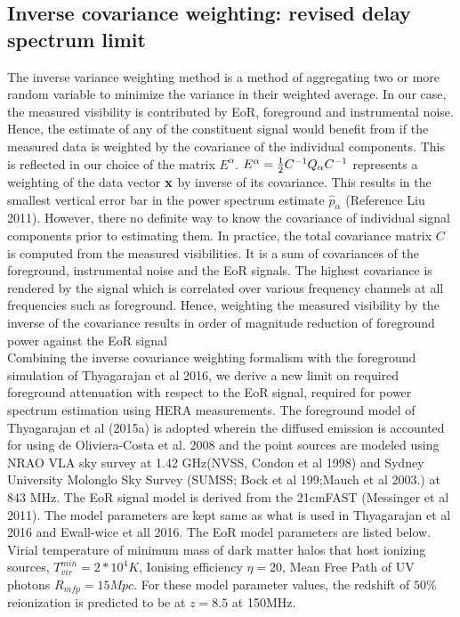 \documentclass[twocolumn]{emulateapj}
\begin{document}
\subsection{Inverse covariance weighting: revised delay spectrum limit}
The inverse variance weighting method is a method of aggregating two or more random variable to minimize the variance in their weighted average. In our case, the measured visibility is contributed by EoR, foreground and instrumental noise. Hence, the estimate of any of the constituent signal would benefit from if the measured data is weighted by the covariance of the individual components. This is reflected in our choice of the matrix $E^{\alpha}$.  $E^{\alpha} = {1 \over 2} C^{-1} Q_{\alpha} C^{-1}$ represents a weighting of the data vector $\bold x$ by inverse of its covariance. This results in the smallest vertical error bar in the power spectrum estimate $\hat p_{\alpha}$ (Reference Liu 2011). 
However, there no definite way to know the covariance of individual signal components prior to estimating them. In practice, the total covariance matrix $C$ is computed from the measured visibilities. It is a sum of covariances of the foreground, instrumental noise and the EoR signals. The highest covariance is rendered by the signal which is correlated over various frequency channels at all frequencies such as foreground. Hence, weighting the measured visibility by the inverse of the covariance results in order of magnitude reduction of foreground power against the EoR signal \\
 Combining the inverse covariance weighting formalism with the foreground simulation of Thyagarajan et al 2016, we derive a new limit on required foreground attenuation with respect to the EoR signal, required for power spectrum estimation using HERA measurements. The foreground model of Thyagarajan et al (2015a) is adopted wherein the diffused emission is accounted for using de Oliviera-Costa et al. 2008 and the point sources are modeled using NRAO VLA sky survey at 1.42 GHz(NVSS, Condon et al 1998) and Sydney University Molonglo Sky Survey (SUMSS; Bock et al 199;Mauch et al 2003.) at 843 MHz. The EoR signal model is derived from the 21cmFAST (Messinger et al 2011). The model parameters are kept same as what is used in Thyagarajan et al 2016 and Ewall-wice et all 2016. The EoR model parameters are listed below.\\
 Virial temperature of minimum mass of dark matter halos that host ionizing sources, $T_{vir}^{min} = 2*10^4 K$, Ionising efficiency $\eta = 20$, Mean Free Path of UV photons $R_{mfp} = 15Mpc.$ For these model parameter values, the redshift of $50\%$ reionization is predicted to be at $z = 8.5$ at 150MHz.\\
\end{document}
